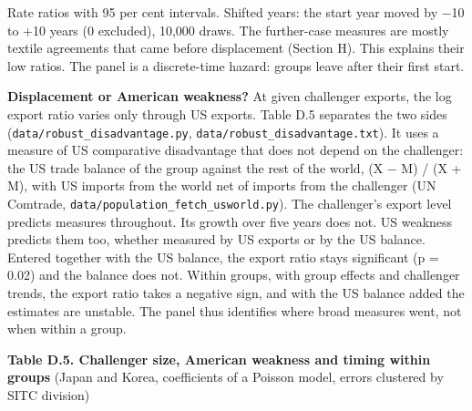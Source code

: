 Rate ratios with 95 per cent intervals. Shifted years: the start year
moved by −10 to +10 years (0 excluded), 10,000 draws. The further-case
measures are mostly textile agreements that came before displacement
(Section H). This explains their low ratios. The panel is a
discrete-time hazard: groups leave after their first start.

\textbf{Displacement or American weakness?} At given challenger exports,
the log export ratio varies only through US exports. Table D.5 separates
the two sides (\texttt{data/\allowbreak{}robust\_\allowbreak{}disadvantage.py},
\texttt{data/\allowbreak{}robust\_\allowbreak{}disadvantage.txt}). It uses a measure of US
comparative disadvantage that does not depend on the challenger: the US
trade balance of the group against the rest of the world, (X − M) / (X +
M), with US imports from the world net of imports from the challenger
(UN Comtrade, \texttt{data/\allowbreak{}population\_\allowbreak{}fetch\_\allowbreak{}usworld.py}). The
challenger's export level predicts measures throughout. Its growth over
five years does not. US weakness predicts them too, whether measured by
US exports or by the US balance. Entered together with the US balance,
the export ratio stays significant (p = 0.02) and the balance does not.
Within groups, with group effects and challenger trends, the export
ratio takes a negative sign, and with the US balance added the estimates
are unstable. The panel thus identifies where broad measures went, not
when within a group.

\textbf{Table D.5. Challenger size, American weakness and timing within
groups} (Japan and Korea, coefficients of a Poisson model, errors
clustered by SITC division)


